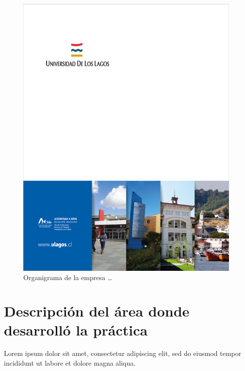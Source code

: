 \documentclass[letter,12pt]{report}
\begin{document}
\begin{figure}[H]
\centering
 \includegraphics[scale=0.1]{portada}
  \caption{Organigrama de la empresa \dots}
\end{figure}

\section[Descripción del Área]{Descripción del área donde desarrolló la práctica}
Lorem ipsum dolor sit amet, consectetur adipiscing elit, sed do eiusmod tempor incididunt ut labore et dolore magna aliqua.
\end{document}
